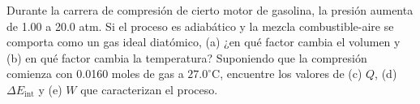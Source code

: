 \item Durante la carrera de compresión de cierto motor de gasolina, la presión aumenta de 1.00 a 20.0 atm. Si el proceso es adiabático y la mezcla combustible-aire se comporta como un gas ideal diatómico, (a) ¿en qué factor cambia el volumen y (b) en qué factor cambia la temperatura? Suponiendo que la compresión comienza con 0.0160 moles de gas a $27.0^\circ\text{C}$, encuentre los valores de (c) $Q$, (d) $\Delta E_{\text{int}}$ y (e) $W$ que caracterizan el proceso.
